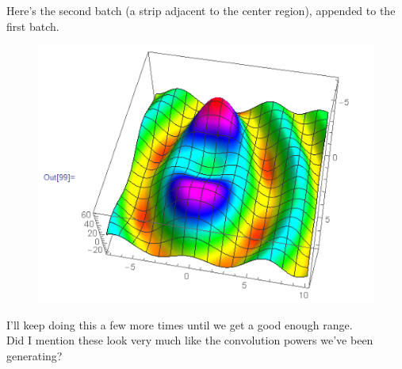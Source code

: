 \documentclass{article}
\theoremstyle{definition}
\begin{document}
Here's the second batch (a strip adjacent to the center region), appended to the first batch.
\begin{figure}[!htb]
	\centering
	\includegraphics[scale=0.35]{conv-7}
\end{figure}




I'll keep doing this a few more times until we get a good enough range.\\


Did I mention these look very much like the convolution powers we've been generating?







\newpage
\end{document}
